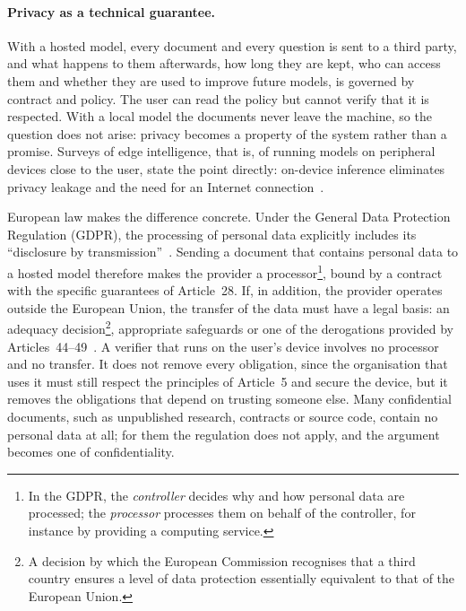 \paragraph{Privacy as a technical guarantee.} With a hosted model, every document and every question is sent to a
third party, and what happens to them afterwards, how long they are kept, who can access them and whether they are used
to improve future models, is governed by contract and policy. The user can read the policy but cannot verify that it is
respected. With a local model the documents never leave the machine, so the question does not arise: privacy becomes a
property of the system rather than a promise. Surveys of edge intelligence, that is, of running models on peripheral
devices close to the user, state the point directly: on-device inference eliminates privacy leakage and the need for an
Internet connection~\cite{qu2025mobileedge}.

European law makes the difference concrete. Under the General Data Protection Regulation (GDPR), the processing of
personal data explicitly includes its ``disclosure by transmission''~\cite[Art.~4(2)]{gdpr2016}. Sending a document that
contains personal data to a hosted model therefore makes the provider a processor\footnote{In the GDPR, the
\emph{controller} decides why and how personal data are processed; the \emph{processor} processes them on behalf of the
controller, for instance by providing a computing service.}, bound by a contract with the specific guarantees of
Article~28. If, in addition, the provider operates outside the European Union, the transfer of the data must have a legal
basis: an adequacy decision\footnote{A decision by which the European Commission recognises that a third country ensures
a level of data protection essentially equivalent to that of the European Union.}, appropriate safeguards or one of the
derogations provided by Articles~44--49~\cite{gdpr2016}. A verifier that runs on the user's device involves no processor
and no transfer. It does not remove every obligation, since the
organisation that uses it must still respect the principles of Article~5 and secure the device, but it removes the
obligations that depend on trusting someone else. Many confidential documents, such as unpublished research, contracts
or source code, contain no personal data at all; for them the regulation does not apply, and the argument becomes one
of confidentiality.

